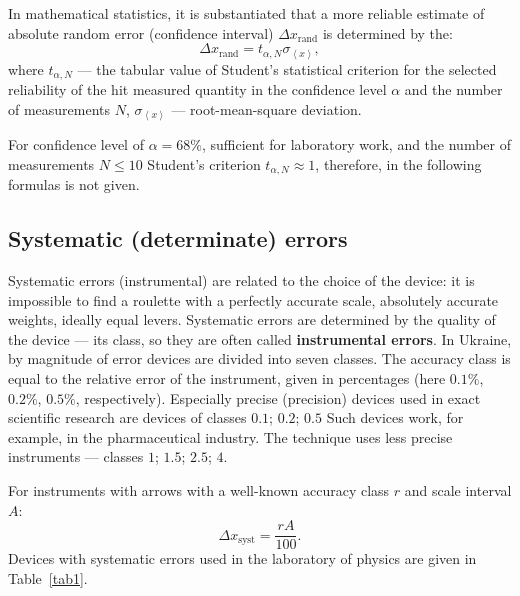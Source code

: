 \documentclass{LabWorkEng}
\begin{document}
\noindent%
\begin{More}
	In mathematical statistics, it is substantiated that a more reliable estimate of absolute random error (confidence interval) $\Delta x_\mathrm{rand}$ is determined by the:
	\begin{equation*}
		\Delta x_\mathrm{rand} = t_{\alpha, N} \sigma_{\left\langle x \right\rangle},
	\end{equation*}
	where  $t_{\alpha, N}$ ---  the tabular value of Student's statistical criterion for the selected reliability of the hit measured quantity in the confidence level $\alpha$ and the number of measurements $N$, $\sigma_{\left\langle x \right\rangle}$ --- root-mean-square deviation.

	For confidence level of $\alpha = 68\%$, sufficient for laboratory work, and the number of measurements $N \le 10$ Student's criterion $t_{\alpha, N} \approx 1$, therefore, in the following formulas is not given.
\end{More}

\subsection{Systematic (determinate) errors}

Systematic errors (instrumental) are related to the choice of the device: it is impossible to find a roulette with a perfectly accurate scale, absolutely accurate weights, ideally equal levers. Systematic errors are determined by the quality of the device --- its class, so they are often called \textbf{instrumental errors}. In Ukraine, by magnitude of error devices are divided into seven classes. The accuracy class is equal to the relative error of the instrument, given in percentages (here $0.1\%$, $0.2\%$, $0.5\%$, respectively). Especially precise (precision) devices used in exact scientific research are devices of classes $0.1$; $0.2$; $0.5$ Such devices work, for example, in the pharmaceutical industry. The technique uses less precise instruments --- classes $1$; $1.5$; $2.5$; $4$.

For instruments with arrows with a well-known accuracy class $r$ and scale interval $A$:
\begin{equation}\label{syst}
	\Delta x_\mathrm{syst} = \frac{rA}{100}.
\end{equation}
Devices with systematic errors used in the laboratory of physics are given in Table~\ref{tab1}.
\end{document}
